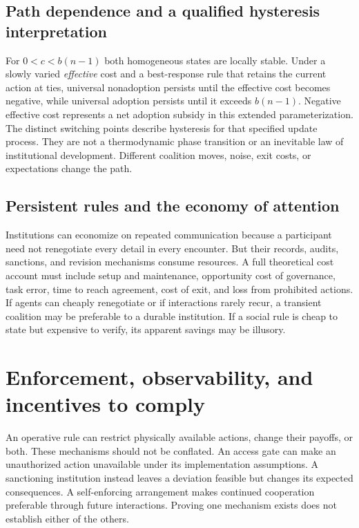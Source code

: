 \documentclass[11pt,letterpaper]{article}
\theoremstyle{plain}
\theoremstyle{definition}
\theoremstyle{remark}
\begin{document}
\subsection{Path dependence and a qualified hysteresis interpretation}
For $0<c<b(n-1)$ both homogeneous states are locally stable. Under a slowly varied \emph{effective} cost and a best-response rule that retains the current action at ties, universal nonadoption persists until the effective cost becomes negative, while universal adoption persists until it exceeds $b(n-1)$. Negative effective cost represents a net adoption subsidy in this extended parameterization. The distinct switching points describe hysteresis for that specified update process. They are not a thermodynamic phase transition or an inevitable law of institutional development. Different coalition moves, noise, exit costs, or expectations change the path.

\subsection{Persistent rules and the economy of attention}

Institutions can economize on repeated communication because a participant need not renegotiate every detail in every encounter. But their records, audits, sanctions, and revision mechanisms consume resources. A full theoretical cost account must include setup and maintenance, opportunity cost of governance, task error, time to reach agreement, cost of exit, and loss from prohibited actions. If agents can cheaply renegotiate or if interactions rarely recur, a transient coalition may be preferable to a durable institution. If a social rule is cheap to state but expensive to verify, its apparent savings may be illusory.


\section{Enforcement, observability, and incentives to comply}\label{sec:enforcement}

An operative rule can restrict physically available actions, change their payoffs, or both. These mechanisms should not be conflated. An access gate can make an unauthorized action unavailable under its implementation assumptions. A sanctioning institution instead leaves a deviation feasible but changes its expected consequences. A self-enforcing arrangement makes continued cooperation preferable through future interactions. Proving one mechanism exists does not establish either of the others.
\end{document}
